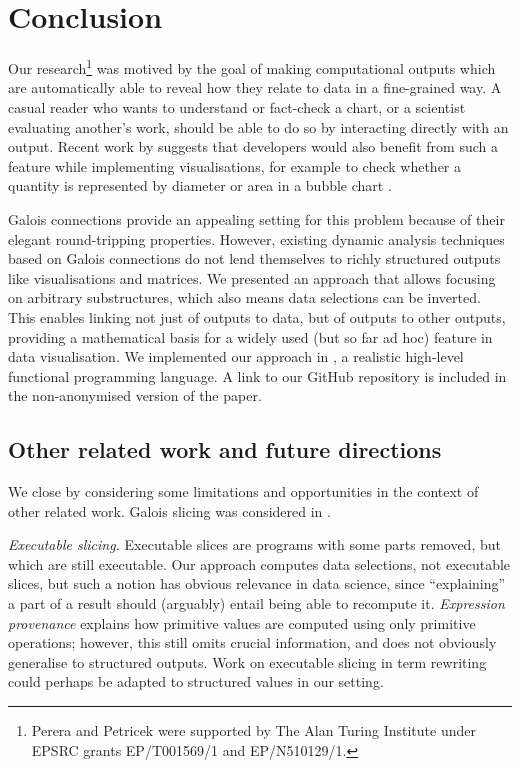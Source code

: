 \section{Conclusion}
\label{sec:conclusion}

Our research\footnote{Perera and Petricek were supported by The Alan Turing Institute under EPSRC grants EP/T001569/1 and EP/N510129/1.} was motived by the goal of making computational outputs which are automatically able to reveal how they relate to data in a fine-grained way. A casual reader who wants to understand or fact-check a chart, or a scientist evaluating another's work, should be able to do so by interacting directly with an output. Recent work by \citeauthor{walny19} suggests that developers would also benefit from such a feature while implementing visualisations, for example to check whether a quantity is represented by diameter or area in a bubble chart \cite{walny19}.

Galois connections provide an appealing setting for this problem because of their elegant round-tripping properties. However,  existing dynamic analysis techniques based on Galois connections do not lend themselves to richly structured outputs like visualisations and matrices. We presented an approach that allows focusing on arbitrary substructures, which also means data selections can be inverted. This enables linking not just of outputs to data, but of outputs to other outputs, providing a mathematical basis for a widely used (but so far ad hoc) feature in data visualisation. We implemented our approach in \href{https://github.com/explorable-viz/fluid}{\OurLanguage}, a realistic high-level functional programming language. %
\ifanonymous%
   A link to our GitHub repository is included in the non-anonymised version of the paper.
\else%
\fi%

\subsection{Other related work and future directions}
\label{sec:conclusion:other-related-work}

We close by considering some limitations and opportunities in the context of other related work. Galois slicing \cite{perera12a,ricciotti17,perera16d} was considered in .

\emph{Executable slicing.} Executable slices \cite{hall95} are programs with some parts removed, but which are still executable. Our approach computes data selections, not executable slices, but such a notion has obvious relevance in data science, since ``explaining'' a part of a result should (arguably) entail being able to recompute it. \emph{Expression provenance} \cite{acar12} explains how primitive values are computed using only primitive operations; however, this still omits crucial information, and does not obviously generalise to structured outputs. Work on executable slicing in term rewriting \cite{field98} could perhaps be adapted to structured values in our setting.

